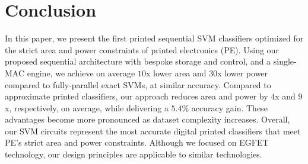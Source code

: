 \section{Conclusion} \label{sec:conclusion}


In this paper, we present the first printed sequential SVM classifiers optimized for the strict area and power constraints of printed electronics (PE).
Using our proposed sequential architecture with bespoke storage and control, and a single-MAC engine, we achieve on average $10$x lower area and $30$x lower power compared to fully-parallel exact SVMs, at similar accuracy.
Compared to approximate printed classifiers, our approach reduces area and power by $4$x and $9$x, respectively, on average, while delivering a $5.4$\% accuracy gain.
These advantages become more pronounced as dataset complexity increases.
Overall, our SVM circuits represent the most accurate digital printed classifiers that meet PE's strict area and power constraints.
Although we focused on EGFET technology, our design principles are applicable to similar technologies.